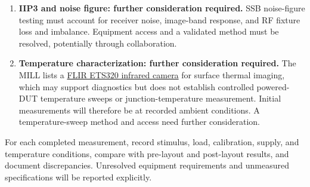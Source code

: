 \begin{enumerate}
    \item \textbf{IIP3 and noise figure: further consideration required.}
    SSB noise-figure testing must account for receiver noise, image-band response, and RF fixture loss and imbalance.
    Equipment access and a validated method must be resolved, potentially through collaboration.

    \item \textbf{Temperature characterization: further consideration required.}
    The MILL lists a \href{https://mill.mse.gatech.edu/equipment/measurement-team/}{FLIR ETS320 infrared camera} for surface thermal imaging, which may support diagnostics but does not establish controlled powered-DUT temperature sweeps or junction-temperature measurement.
    Initial measurements will therefore be at recorded ambient conditions. A temperature-sweep method and access need further consideration.
\end{enumerate}

For each completed measurement, record stimulus, load, calibration, supply, and temperature conditions, compare with pre-layout and post-layout results, and document discrepancies.
Unresolved equipment requirements and unmeasured specifications will be reported explicitly.
